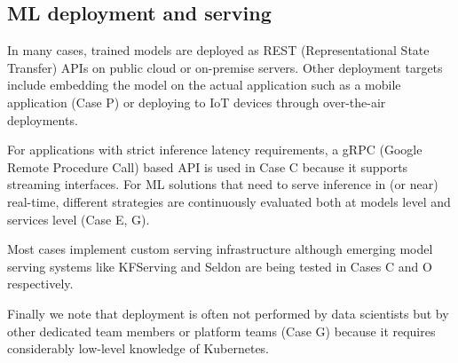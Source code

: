 

\subsection{ML deployment and serving}
In many cases, trained models are deployed as REST (Representational State Transfer) APIs on public cloud or on-premise servers. Other deployment targets include embedding the model on the actual application  such as a mobile application (Case P) or deploying to IoT devices through over-the-air deployments.

For applications with strict inference latency requirements, a gRPC (Google Remote Procedure Call) based API is used in Case C because it supports streaming interfaces. For ML solutions that need to serve inference in (or near) real-time, different strategies are continuously evaluated both at models level and services level (Case E, G). 

Most cases implement custom serving infrastructure although emerging model serving systems like KFServing and Seldon are being tested in Cases C and O respectively. 

Finally we note that deployment is often not performed by data scientists but by other dedicated team members or platform teams (Case G) because it requires considerably low-level knowledge of Kubernetes.





